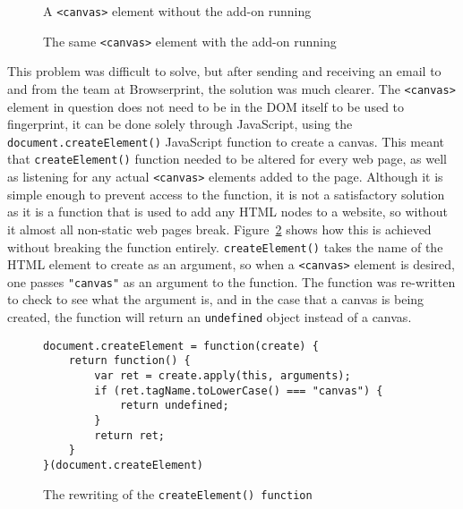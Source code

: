 \begin{figure}[!tbp]
    \centering
    \begin{minipage}[b]{0.4\textwidth}
        \caption{A \texttt{<canvas>} element without the add-on running}
        \label{fig:hello-world-canvas}
    \end{minipage}
    \hfill
    \begin{minipage}[b]{0.4\textwidth}
        \caption{The same \texttt{<canvas>} element with the add-on running}
        \label{fig:blank-canvas}
    \end{minipage}
\end{figure}

This problem was difficult to solve, but after sending and receiving an email to and from the team at Browserprint, the solution was much clearer.
The \texttt{<canvas>} element in question does not need to be in the DOM itself to be used to fingerprint, it can be done solely through JavaScript, using the \texttt{document.createElement()} JavaScript function to create a canvas.
This meant that \texttt{createElement()} function needed to be altered for every web page, as well as listening for any actual \texttt{<canvas>} elements added to the page.
Although it is simple enough to prevent access to the function, it is not a satisfactory solution as it is a function that is used to add any HTML nodes to a website, so without it almost all non-static web pages break.
Figure~\ref{lst:create-element} shows how this is achieved without breaking the function entirely.
\texttt{createElement()} takes the name of the HTML element to create as an argument, so when a \texttt{<canvas>} element is desired, one passes \texttt{"canvas"} as an argument to the function.
The function was re-written to check to see what the argument is, and in the case that a canvas is being created, the function will return an \texttt{undefined} object instead of a canvas.

\begin{figure}[h!]
\begin{lstlisting}
document.createElement = function(create) {
    return function() {
        var ret = create.apply(this, arguments);
        if (ret.tagName.toLowerCase() === "canvas") {
            return undefined;
        }
        return ret;
    }
}(document.createElement)
\end{lstlisting}
\caption{The rewriting of the \texttt{createElement() function}}
\label{lst:create-element}
\end{figure}

